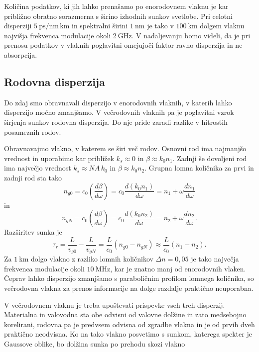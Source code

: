 Količina podatkov, ki jih lahko prenašamo po enorodovnem vlaknu je kar približno obratno 
sorazmerna s širino izhodnih sunkov svetlobe. Pri celotni disperziji 
$5~\si{\pico\second/\nano\meter\,\kilo\meter}$ in 
spektralni širini $1~\si{\nano\meter}$ je tako v $100~\si{\kilo\meter}$ 
dolgem vlaknu najvišja frekvenca modulacije
okoli $2~\si{\giga\hertz}$. V nadaljevanju bomo videli, da je pri prenosu podatkov
v vlaknih poglavitni omejujoči faktor ravno disperzija in ne absorpcija. 

\subsection*{Rodovna disperzija}
Do zdaj smo obravnavali disperzijo v enorodovnih vlaknih, v katerih
lahko disperzijo močno zmanjšamo. V večrodovnih vlaknih pa
je poglavitni vzrok širjenja sunkov rodovna disperzija. Do nje pride zaradi razlike 
v hitrostih posameznih rodov. 

Obravnavajmo vlakno, v katerem se širi več rodov. Osnovni rod ima najmanjšo
vrednost in uporabimo kar približek $k_s \approx 0$ in $\beta \approx k_0 n_1$. 
Zadnji še dovoljeni rod ima
največjo vrednost $k_s \approx NA\, k_0$ in $\beta \approx k_0 n_2$. Grupna
lomna količnika za prvi in zadnji rod sta tako
\begin{equation}
n_{g0} = c_0 \left(\frac{d\beta}{d\omega}\right) = c_0 \frac{d(k_0n_1)}{d\omega} = 
n_1 + \omega \frac{dn_1}{d\omega}
\end{equation}
in
\begin{equation}
n_{gN} = c_0 \left(\frac{d\beta}{d\omega}\right) = c_0 \frac{d(k_0n_2)}{d\omega} = 
n_2 + \omega \frac{dn_2}{d\omega}.
\end{equation}
Razširitev sunka je 
\begin{equation}
\tau_r = \frac{L}{v_{g0}}-\frac{L}{v_{gN}} = \frac{L}{c_0} (n_{g0}-n_{gN}) \approx 
\frac{L}{c_0} (n_1-n_2).
\label{DispRod}
\end{equation}
Za $1~\si{\kilo\meter}$ dolgo vlakno z razliko lomnih količnikov $\Delta n = 0,05$  je tako
največja frekvenca modulacije okoli $10~\si{\mega\hertz}$, kar je znatno manj od enorodovnih vlaken.
Čeprav lahko disperzijo zmanjšamo s paraboličnim profilom lomnega količnika, so
večrodovna vlakna za prenos informacije na dolge razdalje praktično neuporabna. 

V večrodovnem vlaknu je treba upoštevati prispevke vseh treh disperzij. Materialna
in valovodna sta obe odvisni od valovne dolžine in zato medsebojno korelirani, rodovna pa 
je predvsem odvisna od zgradbe vlakna in je od prvih dveh praktično neodvisna. Ko na 
tako vlakno posvetimo s sunkom, katerega spekter je Gaussove oblike, bo dolžina 
sunka po prehodu skozi vlakno

